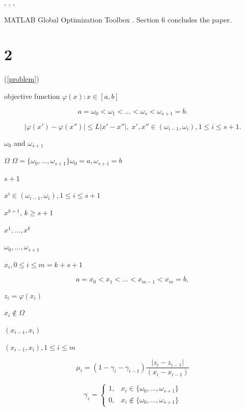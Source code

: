 \documentclass[runningheads]{llncs}
\begin{document}
\cite{Moreau2000}, \cite{Batukhtin1993}, \cite{Batukhtin1998}
\cite{Ban2019}, \cite{ZhangXu}

\cite{Strongin2000}

 MATLAB Global Optimization Toolbox \cite{MatlabOTB}. Section 6 concludes the paper. 


\section{2}

(\ref{problem})

objective function $\varphi(x):x\in[a,b]$

\begin{equation}\label{points}
a = \omega_0 <\omega_1 < ... <\omega_s < \omega_{s+1} = b.
\end{equation}


\begin{equation}\label{LipschitzСondition}
\left|\varphi(x')-\varphi(x'')\right|\leq L\left|x'-x''\right|,\; x',x'' \in (\omega_{i-1},\omega_{i}), 1 \leq i \leq s+1.
\end{equation}

$\omega_{0}$ and $\omega_{s+1}$

$\Omega$ $\Omega = \{\omega_{0}, ..., \omega_{s+1}\} \omega_{0} = a, \omega_{s+1} = b$

\cite{Strongin2000}

$s+1$

$x^i \in (\omega_{i-1},\omega_{i}), 1 \leq i \leq s+1 $

$x^{k+1}$, $k \geq s+1$

$x^1,…,x^k$

$\omega_{0}, ..., \omega_{s+1}$

$x_i, 0\leq i \leq m = k + s + 1$

\begin{equation}\label{pointsX}
a = x_0 < x_1 < ... < x_{m-1} < x_{m} = b,
\end{equation}

$z_i=\varphi(x_i)$

$x_i \not\in \Omega$

$(x_{i-1},x_i )$

$(x_{i-1},x_i ), 1\leq i \leq m$

\begin{equation}\label{mu_i}
\mu_i=(1-\gamma_i-\gamma_{i-1} )  \frac{|z_i-z_{i-1} |}{(x_i-x_{i-1} )}
\end{equation}

\begin{equation}\label{gamma}
\gamma_i = 
\begin{cases}
	1, &\text{$x_i \in \{\omega_{0},...,\omega_{s+1}\} $} \\
	0, &\text{$x_i \not\in \{\omega_{0},...,\omega_{s+1}\} $}
\end{cases}
\end{equation}
\end{document}
